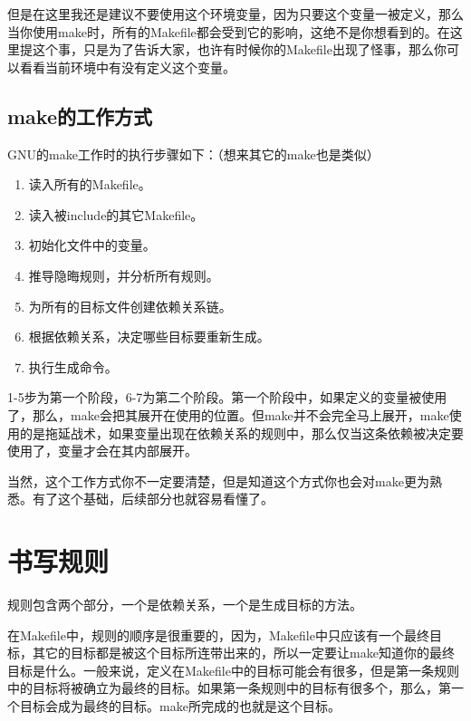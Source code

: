 \documentclass[a4paper,10pt]{sphinxmanual}
\begin{document}
但是在这里我还是建议不要使用这个环境变量，因为只要这个变量一被定义，那么当你使用make时，所有的Makefile都会受到它的影响，这绝不是你想看到的。在这里提这个事，只是为了告诉大家，也许有时候你的Makefile出现了怪事，那么你可以看看当前环境中有没有定义这个变量。


\section{make的工作方式}
\label{\detokenize{introduction:id10}}
GNU的make工作时的执行步骤如下：（想来其它的make也是类似）
\begin{enumerate}
\def\theenumi{\arabic{enumi}}
\def\labelenumi{\theenumi .}
\makeatletter\def\p@enumii{\p@enumi \theenumi .}\makeatother
\item {} 
读入所有的Makefile。

\item {} 
读入被include的其它Makefile。

\item {} 
初始化文件中的变量。

\item {} 
推导隐晦规则，并分析所有规则。

\item {} 
为所有的目标文件创建依赖关系链。

\item {} 
根据依赖关系，决定哪些目标要重新生成。

\item {} 
执行生成命令。

\end{enumerate}

1-5步为第一个阶段，6-7为第二个阶段。第一个阶段中，如果定义的变量被使用了，那么，make会把其展开在使用的位置。但make并不会完全马上展开，make使用的是拖延战术，如果变量出现在依赖关系的规则中，那么仅当这条依赖被决定要使用了，变量才会在其内部展开。

当然，这个工作方式你不一定要清楚，但是知道这个方式你也会对make更为熟悉。有了这个基础，后续部分也就容易看懂了。


\chapter{书写规则}
\label{\detokenize{rules:id1}}\label{\detokenize{rules::doc}}
规则包含两个部分，一个是依赖关系，一个是生成目标的方法。

在Makefile中，规则的顺序是很重要的，因为，Makefile中只应该有一个最终目标，其它的目标都是被这个目标所连带出来的，所以一定要让make知道你的最终目标是什么。一般来说，定义在Makefile中的目标可能会有很多，但是第一条规则中的目标将被确立为最终的目标。如果第一条规则中的目标有很多个，那么，第一个目标会成为最终的目标。make所完成的也就是这个目标。
\end{document}
